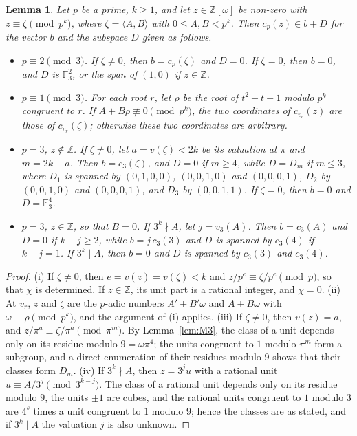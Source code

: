 \documentclass[11pt]{article}
\newtheorem{lemma}[theorem]{Lemma}
\newcommand{\Z}{\mathbb{Z}}
\newcommand{\F}{\mathbb{F}}
\begin{document}
\begin{lemma}\label{lem:residue}
Let $p$ be a prime, $k\geq1$, and let $z\in\Z[\omega]$ be non-zero with $z\equiv\zeta\pmod{p^k}$, where $\zeta=\langle A,B\rangle$ with $0\leq A,B<p^k$. Then $c_p(z)\in b+D$ for the vector $b$ and the subspace $D$ given as follows.
\begin{itemize}
\item[(i)] $p\equiv2\pmod3$. If $\zeta\neq0$, then $b=c_p(\zeta)$ and $D=0$. If $\zeta=0$, then $b=0$, and $D$ is $\F_3^2$, or the span of $(1,0)$ if $z\in\Z$.
\item[(ii)] $p\equiv1\pmod3$. For each root $r$, let $\rho$ be the root of $t^2+t+1$ modulo $p^k$ congruent to $r$. If $A+B\rho\not\equiv0\pmod{p^k}$, the two coordinates of $c_{v_r}(z)$ are those of $c_{v_r}(\zeta)$; otherwise these two coordinates are arbitrary.
\item[(iii)] $p=3$, $z\notin\Z$. If $\zeta\neq0$, let $a=v(\zeta)<2k$ be its valuation at $\pi$ and $m=2k-a$. Then $b=c_3(\zeta)$, and $D=0$ if $m\geq4$, while $D=D_m$ if $m\leq3$, where $D_1$ is spanned by $(0,1,0,0)$, $(0,0,1,0)$ and $(0,0,0,1)$, $D_2$ by $(0,0,1,0)$ and $(0,0,0,1)$, and $D_3$ by $(0,0,1,1)$. If $\zeta=0$, then $b=0$ and $D=\F_3^4$.
\item[(iv)] $p=3$, $z\in\Z$, so that $B=0$. If $3^k\nmid A$, let $j=v_3(A)$. Then $b=c_3(A)$ and $D=0$ if $k-j\geq2$, while $b=j\,c_3(3)$ and $D$ is spanned by $c_3(4)$ if $k-j=1$. If $3^k\mid A$, then $b=0$ and $D$ is spanned by $c_3(3)$ and $c_3(4)$.
\end{itemize}
\end{lemma}

\begin{proof}
(i) If $\zeta\neq0$, then $e=v(z)=v(\zeta)<k$ and $z/p^e\equiv\zeta/p^e\pmod p$, so that $\chi$ is determined. If $z\in\Z$, its unit part is a rational integer, and $\chi=0$. (ii) At $v_r$, $z$ and $\zeta$ are the $p$-adic numbers $A'+B'\omega$ and $A+B\omega$ with $\omega\equiv\rho\pmod{p^k}$, and the argument of (i) applies. (iii) If $\zeta\neq0$, then $v(z)=a$, and $z/\pi^a\equiv\zeta/\pi^a\pmod{\pi^m}$. By Lemma~\ref{lem:M3}, the class of a unit depends only on its residue modulo $9=\omega\pi^4$; the units congruent to $1$ modulo $\pi^m$ form a subgroup, and a direct enumeration of their residues modulo $9$ shows that their classes form $D_m$. (iv) If $3^k\nmid A$, then $z=3^ju$ with a rational unit $u\equiv A/3^j\pmod{3^{k-j}}$. The class of a rational unit depends only on its residue modulo $9$, the units $\pm1$ are cubes, and the rational units congruent to $1$ modulo $3$ are $4^s$ times a unit congruent to $1$ modulo $9$; hence the classes are as stated, and if $3^k\mid A$ the valuation $j$ is also unknown.
\end{proof}
\end{document}
